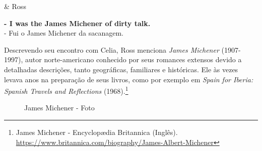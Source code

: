 \begin{tcolorbox}[enhanced,center upper,
    drop fuzzy shadow southeast, boxrule=0.3pt,
    lower separated=false, breakable,
    colframe=black!30!dialogoBorder,colback=white]
\medskip
\begin{minipage}[c]{0.16\linewidth}
   & \centering \scriptsize{Ross}
\end{minipage}
\hfill
\begin{minipage}[c]{0.8\linewidth}
  \textbf{- I was the James Michener of dirty talk.}\\
  - Fui o James Michener da sacanagem.
\end{minipage}
\end{tcolorbox}

\saveparinfos
\noindent
\begin{minipage}[c]{0.5\textwidth}\useparinfo

Descrevendo seu encontro com Celia, Ross menciona \emph{James Michener}
(1907-1997), autor norte-americano conhecido por seus romances extensos
devido a detalhadas descrições, tanto geográficas, familiares e
históricas. Ele às vezes levava anos na preparação de seus livros, como
por exemplo em \emph{Spain for Iberia: Spanish Travels and Reflections}
(1968).\footnote{\sloppy James Michener - Encyclopædia Britannica (Inglês). \url{https://www.britannica.com/biography/James-Albert-Michener}}

\end{minipage}\hfill
\begin{minipage}[c]{0.5\textwidth}

\begin{figure}
  \centering
    \caption{James Michener - Foto\label{fig:james-michener-foto}}
\end{figure}

\end{minipage}
